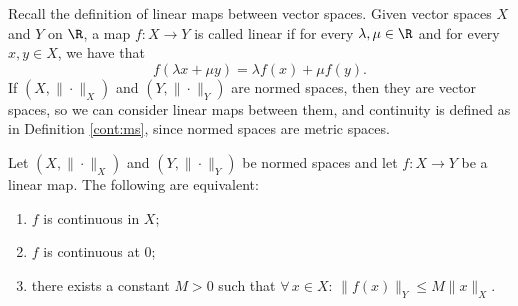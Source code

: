 
Recall the definition of linear maps between vector spaces. Given vector spaces $X$ and $Y$ on $\R$, a map $f: X\to Y$ is called linear if 
for every $\lambda,\mu \in \R$ and for every $x,y \in X$, we have that 
$$
f(\lambda x+ \mu y) = \lambda f(x) + \mu f(y).
$$
If $(X,\| \cdot \|_X)$ and $(Y,\|\cdot  \|_Y)$ are normed spaces, then they are vector spaces, so we can consider linear maps between them, and continuity is 
defined as in Definition \ref{cont:ms}, since normed spaces are metric spaces.

\begin{theorem}\label{cont:0}
Let $(X,\| \cdot \|_X)$ and $(Y,\|\cdot  \|_Y)$ be normed spaces and let $f : X \to Y$ be a linear map. The following are equivalent:
\begin{enumerate}
\item $f$ is continuous in $X$;
\item $f$ is continuous at $0$;
\item there exists a constant $M > 0$  such that $\forall \, x \in X$: $\|f(x)\|_Y \leq M \|x\|_X$.
\end{enumerate}
\end{theorem}


